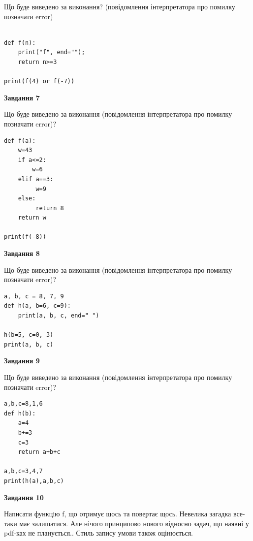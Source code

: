 \documentclass[12pt, ukrainian]{article}
\begin{document}
{\begin {large}
Що буде виведено за виконання? (повідомлення інтерпретатора про помилку позначати error)\par
\begin{verbatim}

def f(n):
    print("f", end="");
    return n>=3

print(f(4) or f(-7))
\end{verbatim}

{\begin {center}\textbf{Завдання 7}\end {center}}

Що буде виведено за виконання (повідомлення інтерпретатора про помилку позначати error)?\par
\begin{verbatim}
def f(a):
    w=43
    if a<=2: 
        w=6
    elif a==3:
         w=9
    else:
         return 8
    return w

print(f(-8))
\end{verbatim}

{\begin {center}\textbf{Завдання 8}\end {center}}

Що буде виведено за виконання (повідомлення інтерпретатора про помилку позначати error)?\par
\begin{verbatim}
a, b, c = 8, 7, 9
def h(a, b=6, c=9):
    print(a, b, c, end=" ")

h(b=5, c=0, 3)
print(a, b, c)
\end{verbatim}

{\begin {center}\textbf{Завдання 9}\end {center}}

Що буде виведено за виконання (повідомлення інтерпретатора про помилку позначати error)?\par
\begin{verbatim}
a,b,c=8,1,6
def h(b):
    a=4
    b+=3
    c=3
    return a+b+c

a,b,c=3,4,7
print(h(a),a,b,c)
\end{verbatim}

{\begin {center}\textbf{Завдання 10}\end {center}}


Написати функцiю f, що отримує щось та повертає щось. Невелика загадка все-таки має залишатися. Але нічого принципово нового відносно задач, що наявні у pdf-ках не планується.. Стиль запису умови також оцінюється.\par
\end {large}}
\newpage
\end{document}
